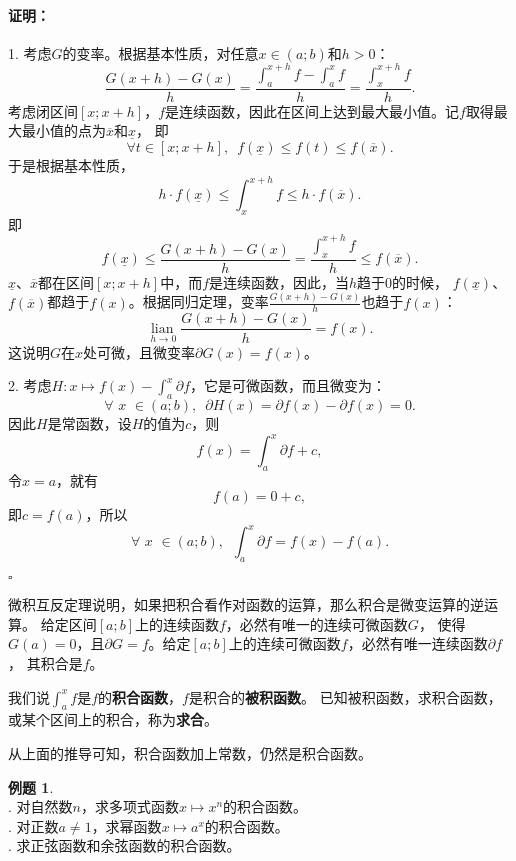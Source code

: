 \documentclass[12pt,UTF8]{ctexbook}
\newcommand{\lian}[1]{
    \underset{#1}{\operatorname{lian}\,}
}
\theoremstyle{definition}
\newtheorem{et}{例题}[section]
\theoremstyle{plain}
\renewenvironment{proof}{\paragraph{\textbf{证明：}}}{\hfill$\square$}
\begin{document}
\begin{proof}
    1. 考虑$G$的变率。根据基本性质，对任意$x\in(a; b)$和$h>0$：
    $$ \frac{G(x+h) - G(x)}{h} = \frac{\int_a^{x+h} f - \int_a^x f}{h} = \frac{\int_x^{x+h} f}{h}. $$
    考虑闭区间$[x; x+h]$，$f$是连续函数，因此在区间上达到最大最小值。记$f$取得最大最小值的点为$\overline{x}$和$\underline{x}$，
    即
    $$ \forall t \in [x; x+h] ,\,\,\, f(\underline{x}) \leqslant f(t) \leqslant f(\overline{x}). $$
    于是根据基本性质，
    $$ h\cdot f(\underline{x}) \leqslant \int_x^{x+h} f \leqslant h\cdot f(\overline{x}). $$
    即
    $$ f(\underline{x}) \leqslant \frac{G(x+h) - G(x)}{h} = \frac{\int_x^{x+h} f}{h} \leqslant f(\overline{x}). $$
    $\underline{x}$、$\overline{x}$都在区间$[x; x+h]$中，而$f$是连续函数，因此，当$h$趋于$0$的时候，
    $f(\underline{x})$、$f(\overline{x})$都趋于$f(x)$。根据同归定理，变率$\frac{G(x+h) - G(x)}{h}$也趋于$f(x)$：
    $$ \lian{h\to 0} \frac{G(x+h) - G(x)}{h} = f(x).$$
    这说明$G$在$x$处可微，且微变率$\partial G (x) = f(x)$。

    2. 考虑$H: x\mapsto f(x) - \int_a^x \partial f$，它是可微函数，而且微变为：
    $$ \forall \,\, x\,\,\in(a; b), \,\,\, \partial H(x) = \partial f(x) - \partial f(x) = 0. $$
    因此$H$是常函数，设$H$的值为$c$，则
    $$f(x) = \int_a^x \partial f + c, $$
    令$x = a$，就有
    $$f(a) = 0 + c,$$
    即$c = f(a)$，所以
    $$ \forall \,\, x\,\,\in(a; b), \,\,\,\int_a^x \partial f = f(x) - f(a).$$

\end{proof}

微积互反定理说明，如果把积合看作对函数的运算，那么积合是微变运算的逆运算。
给定区间$[a; b]$上的连续函数$f$，必然有唯一的连续可微函数$G$，
使得$G(a) = 0$，且$\partial G = f$。给定$[a; b]$上的连续可微函数$f$，必然有唯一连续函数$\partial f$，
其积合是$f$。

我们说$\int_a^x f$是$f$的\textbf{积合函数}，$f$是积合的\textbf{被积函数}。
已知被积函数，求积合函数，或某个区间上的积合，称为\textbf{求合}。

从上面的推导可知，积合函数加上常数，仍然是积合函数。

\begin{et}
    \mbox{} \\
    . 对自然数$n$，求多项式函数$x\mapsto x^n$的积合函数。\\
    . 对正数$a\neq 1$，求幂函数$x\mapsto a^x$的积合函数。\\
    . 求正弦函数和余弦函数的积合函数。
\end{et}
\end{document}
